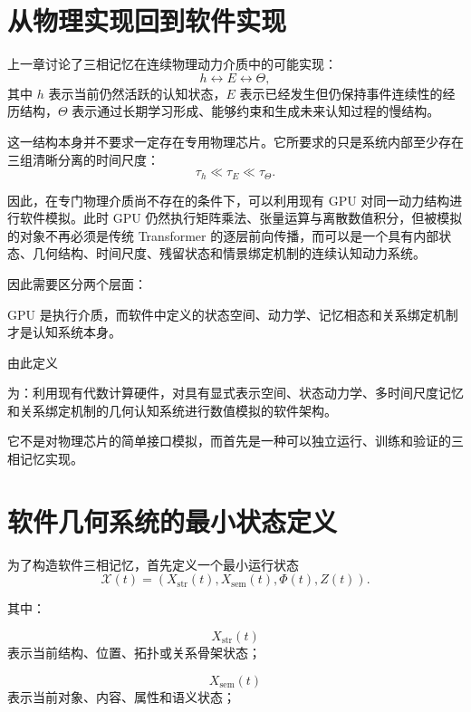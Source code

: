 \section{从物理实现回到软件实现}

上一章讨论了三相记忆在连续物理动力介质中的可能实现：
\[
h
\leftrightarrow
E
\leftrightarrow
\Theta,
\]
其中 $h$ 表示当前仍然活跃的认知状态，$E$ 表示已经发生但仍保持事件连续性的经历结构，$\Theta$ 表示通过长期学习形成、能够约束和生成未来认知过程的慢结构。

这一结构本身并不要求一定存在专用物理芯片。它所要求的只是系统内部至少存在三组清晰分离的时间尺度：
\[
\tau_h\ll\tau_E\ll\tau_\Theta.
\]

因此，在专门物理介质尚不存在的条件下，可以利用现有 GPU 对同一动力结构进行软件模拟。此时 GPU 仍然执行矩阵乘法、张量运算与离散数值积分，但被模拟的对象不再必须是传统 Transformer 的逐层前向传播，而可以是一个具有内部状态、几何结构、时间尺度、残留状态和情景绑定机制的连续认知动力系统。

因此需要区分两个层面：
\begin{statementbox}
\centering
{}
\end{statementbox}

GPU 是执行介质，而软件中定义的状态空间、动力学、记忆相态和关系绑定机制才是认知系统本身。

由此定义
\begin{statementbox}
\centering
{}
\end{statementbox}
为：利用现有代数计算硬件，对具有显式表示空间、状态动力学、多时间尺度记忆和关系绑定机制的几何认知系统进行数值模拟的软件架构。

它不是对物理芯片的简单接口模拟，而首先是一种可以独立运行、训练和验证的三相记忆实现。

\section{软件几何系统的最小状态定义}

为了构造软件三相记忆，首先定义一个最小运行状态
\[
\mathcal{X}(t)
=
\left(
X_{\mathrm{str}}(t),
X_{\mathrm{sem}}(t),
\Phi(t),
Z(t)
\right).
\]

其中：

\[
X_{\mathrm{str}}(t)
\]
表示当前结构、位置、拓扑或关系骨架状态；

\[
X_{\mathrm{sem}}(t)
\]
表示当前对象、内容、属性和语义状态；

